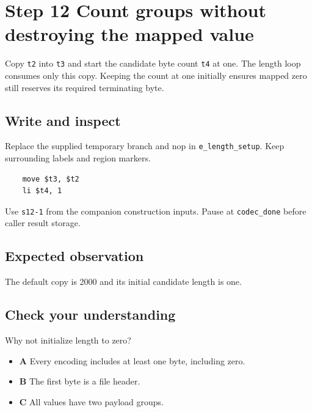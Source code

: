 \section{Step 12 Count groups without destroying the mapped value}\label{delta-s12}

Copy \texttt{t2} into \texttt{t3} and start the candidate byte count \texttt{t4} at one. The length loop consumes only this copy. Keeping the count at one initially ensures mapped zero still reserves its required terminating byte.

\subsection{Write and inspect}
Replace the supplied temporary branch and nop in \texttt{e\_length\_setup}. Keep surrounding labels and region markers.

\begin{verbatim}
    move $t3, $t2
    li $t4, 1
\end{verbatim}
Use \texttt{s12-1} from the companion construction inputs. Pause at \texttt{codec\_done} before caller result storage.

\subsection{Expected observation}
The default copy is 2000 and its initial candidate length is one.

\subsection{Check your understanding}
Why not initialize length to zero?

\begin{itemize}
\item \textbf{A} Every encoding includes at least one byte, including zero.
\item \textbf{B} The first byte is a file header.
\item \textbf{C} All values have two payload groups.
\end{itemize}
